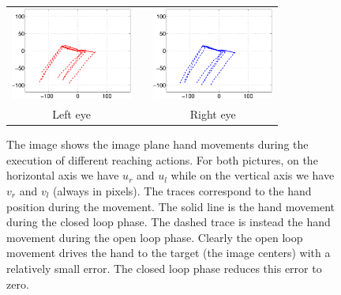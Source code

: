 {\begin{figure}
  \begin{center}
	\begin{tabular}{ccc}
	  \parbox{40mm}{\includegraphics[width=40mm]{Figure/LeftEyeOpenClosedLoop.eps}}  & \hspace{2cm} &
	  \parbox{40mm}{\includegraphics[width=40mm]{Figure/RightEyeOpenClosedLoop.eps}}
	  \\
	  \parbox{40mm}{\centering Left eye } & \hspace{2cm} & \parbox{40mm}{\centering Right eye }
  \end{tabular}
\end{center}
\caption{The image shows the image plane hand movements during the execution 
of different reaching actions. For both pictures, on the horizontal axis 
we have $u_r$ and $u_l$ while on the vertical axis we have $v_r$ and $v_l$ (always in pixels).
The traces correspond to the hand position during the movement. The solid line is the hand movement
during the closed loop phase. The dashed trace is instead the hand movement during the open loop 
phase. Clearly the open loop movement drives the hand to the target (the image centers) with a 
relatively small error. The closed loop phase reduces this error to zero.}\label{Fig:TimeResponseOpenClosedLoopErrors}
  \end{figure}
  
}
